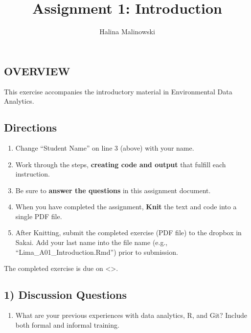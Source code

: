 \documentclass[
]{article}
\title{Assignment 1: Introduction}
\author{Halina Malinowski}
\date{}
\providecommand{\tightlist}{%
  \setlength{\itemsep}{0pt}\setlength{\parskip}{0pt}}
\begin{document}
\maketitle

\hypertarget{overview}{%
\subsection{OVERVIEW}\label{overview}}

This exercise accompanies the introductory material in Environmental
Data Analytics.

\hypertarget{directions}{%
\subsection{Directions}\label{directions}}

\begin{enumerate}
\def\labelenumi{\arabic{enumi}.}
\tightlist
\item
  Change ``Student Name'' on line 3 (above) with your name.
\item
  Work through the steps, \textbf{creating code and output} that fulfill
  each instruction.
\item
  Be sure to \textbf{answer the questions} in this assignment document.
\item
  When you have completed the assignment, \textbf{Knit} the text and
  code into a single PDF file.
\item
  After Knitting, submit the completed exercise (PDF file) to the
  dropbox in Sakai. Add your last name into the file name (e.g.,
  ``Lima\_A01\_Introduction.Rmd'') prior to submission.
\end{enumerate}

The completed exercise is due on \textless\textgreater.

\hypertarget{discussion-questions}{%
\subsection{1) Discussion Questions}\label{discussion-questions}}

\begin{enumerate}
\def\labelenumi{\arabic{enumi}.}
\tightlist
\item
  What are your previous experiences with data analytics, R, and Git?
  Include both formal and informal training.
\end{enumerate}
\end{document}
